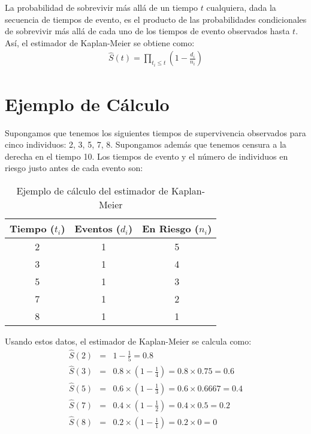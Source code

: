 \documentclass[a4paper]{report} %
\begin{document}
La probabilidad de sobrevivir m\'as all\'a de un tiempo $t$ cualquiera, dada la secuencia de tiempos de evento, es el producto de las probabilidades condicionales de sobrevivir m\'as all\'a de cada uno de los tiempos de evento observados hasta $t$. As\'i, el estimador de Kaplan-Meier se obtiene como:
\begin{eqnarray*}
\hat{S}(t) = \prod_{t_i \leq t} \left(1 - \frac{d_i}{n_i}\right)
\end{eqnarray*}

\section*{Ejemplo de C\'alculo}
Supongamos que tenemos los siguientes tiempos de supervivencia observados para cinco individuos: 2, 3, 5, 7, 8. Supongamos adem\'as que tenemos censura a la derecha en el tiempo 10. Los tiempos de evento y el n\'umero de individuos en riesgo justo antes de cada evento son:

\begin{table}[h]
\centering
\begin{tabular}{|c|c|c|}
\hline
Tiempo ($t_i$) & Eventos ($d_i$) & En Riesgo ($n_i$) \\
\hline
2 & 1 & 5 \\
3 & 1 & 4 \\
5 & 1 & 3 \\
7 & 1 & 2 \\
8 & 1 & 1 \\
\hline
\end{tabular}
\caption{Ejemplo de c\'alculo del estimador de Kaplan-Meier}
\end{table}

Usando estos datos, el estimador de Kaplan-Meier se calcula como:
\begin{eqnarray*}
\hat{S}(2) &=& 1 - \frac{1}{5} = 0.8 \\
\hat{S}(3) &=& 0.8 \times \left(1 - \frac{1}{4}\right) = 0.8 \times 0.75 = 0.6 \\
\hat{S}(5) &=& 0.6 \times \left(1 - \frac{1}{3}\right) = 0.6 \times 0.6667 = 0.4 \\
\hat{S}(7) &=& 0.4 \times \left(1 - \frac{1}{2}\right) = 0.4 \times 0.5 = 0.2 \\
\hat{S}(8) &=& 0.2 \times \left(1 - \frac{1}{1}\right) = 0.2 \times 0 = 0 \\
\end{eqnarray*}
\end{document}
